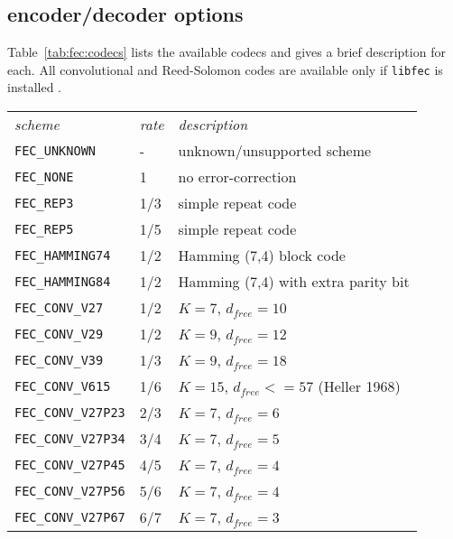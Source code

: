 \subsection{encoder/decoder options}
\label{module:fec:codecs}
Table~\ref{tab:fec:codecs} lists the available codecs and gives a brief
description for each.
All convolutional and Reed-Solomon codes are available only if {\tt libfec} is
installed \cite{fec:web}.

\begin{table*}
\caption{Forward error-correction codecs available in \liquid}
\label{tab:fec:codecs}
\centering
{\small
\begin{tabular*}{0.75\textwidth}{l@{\extracolsep{\fill}}ll}
\toprule
{\it scheme} &
{\it rate} &
{\it description}\\\otoprule
%
{\tt FEC\_UNKNOWN}              & -         & unknown/unsupported scheme\\
{\tt FEC\_NONE}                 & 1         & no error-correction\\
{\tt FEC\_REP3}                 & 1/3       & simple repeat code\\
{\tt FEC\_REP5}                 & 1/5       & simple repeat code\\
{\tt FEC\_HAMMING74}            & 1/2       & Hamming (7,4) block code\\
{\tt FEC\_HAMMING84}            & 1/2       & Hamming (7,4) with extra parity bit\\\midrule
%
{\tt FEC\_CONV\_V27}            & 1/2       & $K=7$, $d_{free}=10$\\
{\tt FEC\_CONV\_V29}            & 1/2       & $K=9$, $d_{free}=12$\\
{\tt FEC\_CONV\_V39}            & 1/3       & $K=9$, $d_{free}=18$\\
{\tt FEC\_CONV\_V615}           & 1/6       & $K=15$, $d_{free}<=57$ (Heller 1968)\\\midrule
%
{\tt FEC\_CONV\_V27P23}         & 2/3       & $K=7$, $d_{free}=6$\\
{\tt FEC\_CONV\_V27P34}         & 3/4       & $K=7$, $d_{free}=5$\\
{\tt FEC\_CONV\_V27P45}         & 4/5       & $K=7$, $d_{free}=4$\\
{\tt FEC\_CONV\_V27P56}         & 5/6       & $K=7$, $d_{free}=4$\\
{\tt FEC\_CONV\_V27P67}         & 6/7       & $K=7$, $d_{free}=3$\\

\end{tabular*}}
\end{table*}
